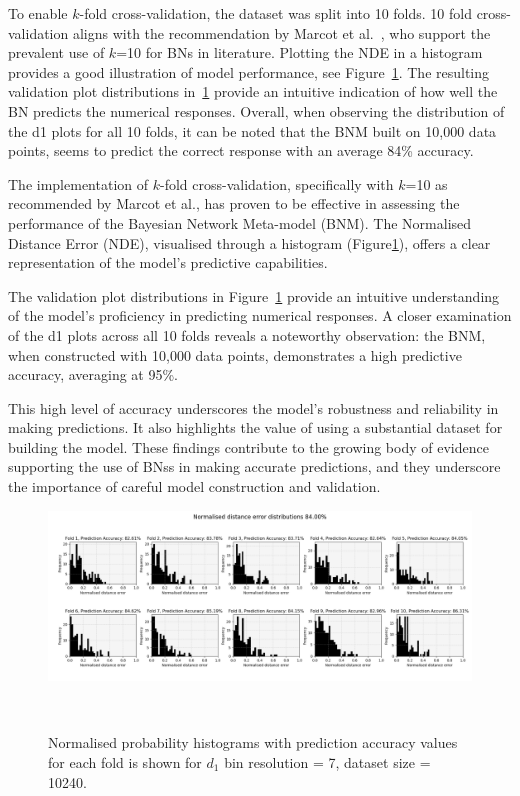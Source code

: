 \documentclass[journal]{IEEEtran}
\begin{document}
To enable $k$-fold cross-validation, the dataset was split into 10 folds. 10 fold cross-validation aligns with the recommendation by Marcot et al.~\cite{Marcot2021}, who support the prevalent use of $k$=10 for BNs in literature. Plotting the NDE in a histogram provides a good illustration of model performance, see Figure~\ref{fig:k-foldhistograms}. The resulting validation plot distributions in~\ref{fig:k-foldhistograms} provide an intuitive indication of how well the BN predicts the numerical responses. Overall, when observing the distribution of the d1 plots for all 10 folds, it can be noted that the BNM built on 10,000 data points, seems to predict the correct response with an average 84\% accuracy.

The implementation of $k$-fold cross-validation, specifically with $k$=10 as recommended by Marcot et al.\cite{Marcot2021}, has proven to be effective in assessing the performance of the Bayesian Network Meta-model (BNM). The Normalised Distance Error (NDE), visualised through a histogram (Figure\ref{fig:k-foldhistograms}), offers a clear representation of the model's predictive capabilities.

The validation plot distributions in Figure~\ref{fig:k-foldhistograms} provide an intuitive understanding of the model's proficiency in predicting numerical responses. A closer examination of the d1 plots across all 10 folds reveals a noteworthy observation: the BNM, when constructed with 10,000 data points, demonstrates a high predictive accuracy, averaging at 95\%.

This high level of accuracy underscores the model's robustness and reliability in making predictions. It also highlights the value of using a substantial dataset for building the model. These findings contribute to the growing body of evidence supporting the use of BNss in making accurate predictions, and they underscore the importance of careful model construction and validation.

\begin{figure}
    \centering
    \includegraphics[width=\textwidth]{figures/TE_results/D1kfold.png}
    \caption{\small Normalised probability histograms with prediction accuracy values for each fold is shown for $d_{1}$ bin resolution = 7, dataset size = 10240.}~\label{fig:k-foldhistograms}
\end{figure}
\end{document}
